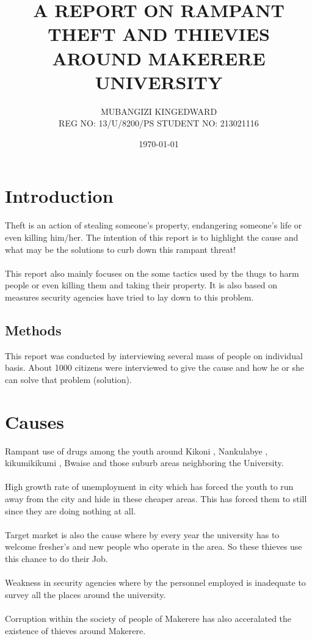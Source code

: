 \documentclass{report}
\begin{document}
\title{A REPORT ON RAMPANT THEFT AND THIEVIES AROUND MAKERERE UNIVERSITY}
\author{MUBANGIZI KINGEDWARD
\\REG NO:  13/U/8200/PS   STUDENT NO:  213021116}
\date{\today}
\maketitle

\section{Introduction}
Theft is an action of stealing someone’s property, endangering someone’s life or even killing him/her. The intention of this report is to highlight the cause and what may be the solutions to curb down this rampant threat!
\\\\
This report also mainly focuses on the some tactics used by the thugs to harm people or even killing them and taking their property. It is also based on measures security agencies have tried to lay down to this problem.

\subsection{Methods}
This report was conducted by interviewing several mass of people on individual basis. About 1000 citizens were interviewed to give the cause and how he or she can solve that problem (solution).

\section{Causes}
Rampant use of drugs among the youth around Kikoni ,  Nankulabye , kikumikikumi , Bwaise and those suburb areas neighboring the University.
\\\\
High growth rate of unemployment in city which has forced the youth to run away from the city and hide in these cheaper areas. This has forced them to still since they are doing nothing at all.
\\\\
Target market is also the cause where by every year the university has to welcome fresher’s and new people who operate in the area. So these thieves use this chance to do their Job.
\\\\
Weakness in security agencies where by the personnel employed is inadequate to survey all the places around the university.
\\\\
Corruption within the society of people of Makerere has also acceralated the existence of thieves around Makerere.
\end{document}
